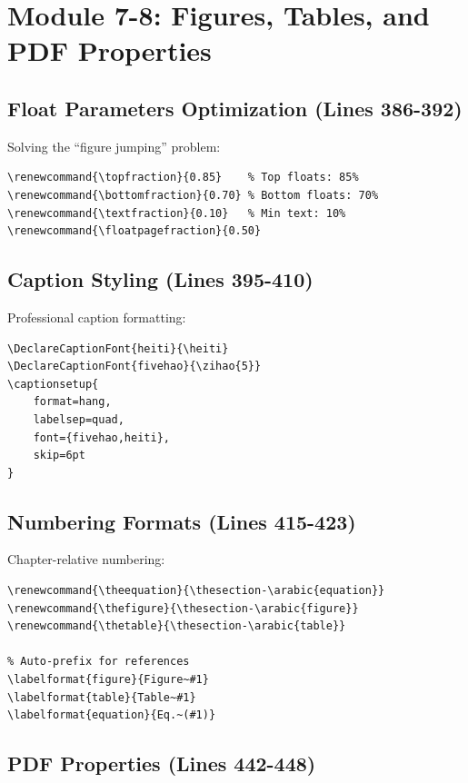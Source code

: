 \documentclass[linux]{hustreport}
\begin{document}
\section{Module 7-8: Figures, Tables, and PDF Properties}

\subsection{Float Parameters Optimization (Lines 386-392)}

Solving the ``figure jumping'' problem:

\begin{verbatim}
\renewcommand{\topfraction}{0.85}    % Top floats: 85%
\renewcommand{\bottomfraction}{0.70} % Bottom floats: 70%
\renewcommand{\textfraction}{0.10}   % Min text: 10%
\renewcommand{\floatpagefraction}{0.50}
\end{verbatim}

\subsection{Caption Styling (Lines 395-410)}

Professional caption formatting:

\begin{verbatim}
\DeclareCaptionFont{heiti}{\heiti}
\DeclareCaptionFont{fivehao}{\zihao{5}}
\captionsetup{
    format=hang,
    labelsep=quad,
    font={fivehao,heiti},
    skip=6pt
}
\end{verbatim}

\subsection{Numbering Formats (Lines 415-423)}

Chapter-relative numbering:

\begin{verbatim}
\renewcommand{\theequation}{\thesection-\arabic{equation}}
\renewcommand{\thefigure}{\thesection-\arabic{figure}}
\renewcommand{\thetable}{\thesection-\arabic{table}}

% Auto-prefix for references
\labelformat{figure}{Figure~#1}
\labelformat{table}{Table~#1}
\labelformat{equation}{Eq.~(#1)}
\end{verbatim}

\subsection{PDF Properties (Lines 442-448)}
\end{document}
